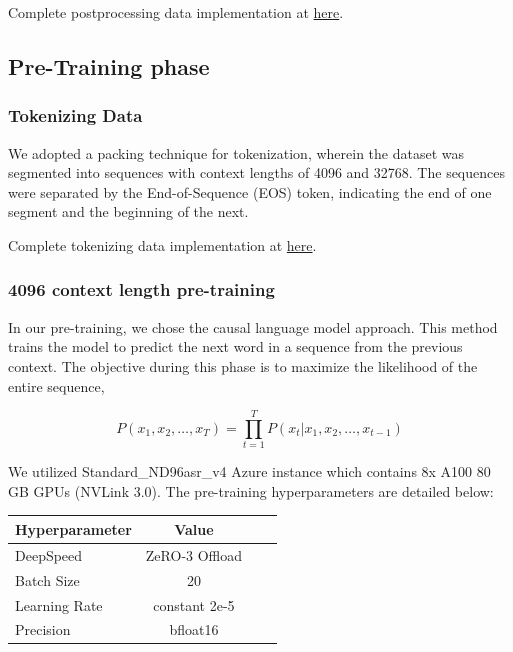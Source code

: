 \documentclass{article}
\begin{document}
Complete postprocessing data implementation at \href{https://github.com/malaysia-ai/dedup-text-dataset?tab=readme-ov-file#postprocessing}{here}.


\subsection{Pre-Training phase}

\subsubsection{Tokenizing Data}

We adopted a packing technique for tokenization, wherein the dataset was segmented into sequences with context lengths of 4096 and 32768. The sequences were separated by the End-of-Sequence (EOS) token, indicating the end of one segment and the beginning of the next.

Complete tokenizing data implementation at \href{https://github.com/malaysia-ai/dedup-text-dataset/tree/main/mistral}{here}.

\subsubsection{4096 context length pre-training}\label{sec:4096-pretrained}

In our pre-training, we chose the causal language model approach. This method trains the model to predict the next word in a sequence from the previous context. The
objective during this phase is to maximize the likelihood of the entire sequence,

\[
  P(x_1, x_2, \ldots, x_T) = \prod_{t=1}^{T} P(x_t | x_1, x_2, \ldots, x_{t-1})
\]

We utilized Standard\_ND96asr\_v4 Azure instance which contains 8x A100 80 GB GPUs (NVLink 3.0). The pre-training hyperparameters are detailed below:

\begin{table}[h]
  \centering
  \begin{tabular}{lccl}
    \hline
    \textbf{Hyperparameter} & \textbf{Value} \\
    \hline
    DeepSpeed               & ZeRO-3 Offload \\
    Batch Size              & 20             \\
    Learning Rate           & constant 2e-5  \\
    Precision               & bfloat16       \\
    \hline
  \end{tabular}
\end{table}
\end{document}
